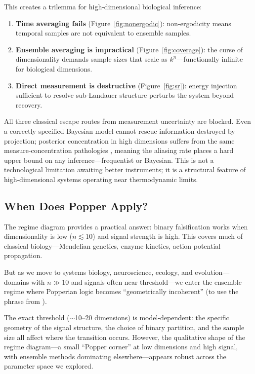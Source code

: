 \documentclass[12pt]{article}
\begin{document}
This creates a trilemma for high-dimensional biological inference:
\begin{enumerate}
    \item \textbf{Time averaging fails} (Figure~\ref{fig:nonergodic}): non-ergodicity means temporal samples are not equivalent to ensemble samples.
    \item \textbf{Ensemble averaging is impractical} (Figure~\ref{fig:coverage}): the curse of dimensionality demands sample sizes that scale as $k^n$---functionally infinite for biological dimensions.
    \item \textbf{Direct measurement is destructive} (Figure~\ref{fig:sr}): energy injection sufficient to resolve sub-Landauer structure perturbs the system beyond recovery.
\end{enumerate}
All three classical escape routes from measurement uncertainty are blocked. Even a correctly specified Bayesian model cannot rescue information destroyed by projection; posterior concentration in high dimensions suffers from the same measure-concentration pathologies \cite{gorban2018}, meaning the aliasing rate places a hard upper bound on any inference---frequentist or Bayesian. This is not a technological limitation awaiting better instruments; it is a structural feature of high-dimensional systems operating near thermodynamic limits.

\subsection{When Does Popper Apply?}

The regime diagram provides a practical answer: binary falsification works when dimensionality is low ($n \lesssim 10$) and signal strength is high. This covers much of classical biology---Mendelian genetics, enzyme kinetics, action potential propagation.

But as we move to systems biology, neuroscience, ecology, and evolution---domains with $n \gg 10$ and signals often near threshold---we enter the ensemble regime where Popperian logic becomes ``geometrically incoherent'' (to use the phrase from \cite{todd2025limits}).

The exact threshold ($\sim$10--20 dimensions) is model-dependent: the specific geometry of the signal structure, the choice of binary partition, and the sample size all affect where the transition occurs. However, the qualitative shape of the regime diagram---a small ``Popper corner'' at low dimensions and high signal, with ensemble methods dominating elsewhere---appears robust across the parameter space we explored.
\end{document}
